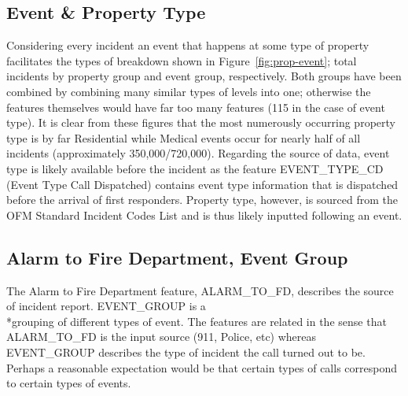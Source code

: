 \documentclass[12pt,letterpaper, oneside]
{article}
\begin{document}
\subsection{Event \& Property Type}
Considering every incident an event that happens at some type of property facilitates the types of breakdown shown in Figure~\ref{fig:prop-event}; total incidents by property group and event group, respectively. Both groups have been combined by combining many similar types of levels into one; otherwise the features themselves would have far too many features (115 in the case of event type). It is clear from these figures that the most numerously occurring property type is by far Residential while Medical events occur for nearly half of all incidents (approximately 350,000/720,000). 
Regarding the source of data, event type is likely available before the incident as the feature \textsf{EVENT\_TYPE\_CD} (Event Type Call Dispatched) contains event type information that is dispatched before the arrival of first responders. Property type, however, is sourced from the OFM Standard Incident Codes List and is thus likely inputted following an event.

\subsection{Alarm to Fire Department, Event Group}
The Alarm to Fire Department feature, \textsf{ALARM\_TO\_FD}, describes the source of incident report. \textsf{EVENT\_GROUP} is a \\*grouping of different types of event. The features are related in the sense that \textsf{ALARM\_TO\_FD} is the input source (911, Police, etc) whereas \textsf{EVENT\_GROUP} describes the type of incident the call turned out to be. Perhaps a reasonable expectation would be that certain types of calls correspond to certain types of events.
\end{document}
